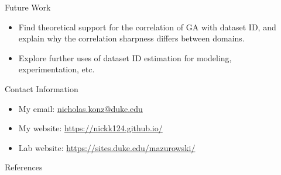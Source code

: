 \documentclass[final,hyperref={pdfpagelabels=false}]{beamer}
\begin{document}
\begin{frame}[t]
\begin{columns}[t]
\begin{column}{.3\textwidth}
\begin{block}{Future Work}
\begin{itemize}
\item Find theoretical support for the correlation of GA with dataset ID, and explain why the correlation sharpness differs between domains.
\item Explore further uses of dataset ID estimation for modeling, experimentation, etc.
\end{itemize}

\end{block}

\begin{block}{Contact Information}
\begin{itemize}
\item My email: \href{mailto:nicholas.konz@duke.edu}{nicholas.konz@duke.edu}
\item My website: \url{https://nickk124.github.io/}
\item Lab website: \url{https://sites.duke.edu/mazurowski/}
\end{itemize}
\end{block}
\begin{block}{References}
        
\small{
}

\end{block}

\end{column} %


\begin{column}{.015\textwidth}\end{column} %

\end{columns} %

\end{frame} %
\end{document}
